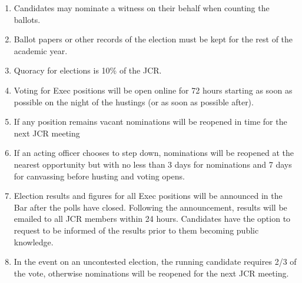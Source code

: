 \begin{enumerate}
\begin{enumerate}
        \item Candidates may nominate a witness on their behalf when counting the ballots.
        \item Ballot papers or other records of the election must be kept for the rest of the academic year.
        \item Quoracy for elections is 10\% of the JCR.
        \item Voting for Exec positions will be open online for 72 hours starting as soon as possible on the night of the hustings (or as soon as possible after).
        \item If any position remains vacant nominations will be reopened in time for the next JCR meeting
        \item If an acting officer chooses to step down, nominations will be reopened at the nearest opportunity but with no less than 3 days for nominations and 7 days for canvassing before husting and voting opens.
        \label{it:Reopen Election}
        \item Election results and figures for all Exec positions will be announced in the Bar after the polls have closed. Following the announcement, results will be emailed to all JCR members within 24 hours. Candidates have the option to request to be informed of the results prior to them becoming public knowledge.
        \item In the event on an uncontested election, the running candidate requires 2/3 of the vote, otherwise nominations will be reopened for the next JCR meeting.
    \end{enumerate}
\end{enumerate}

